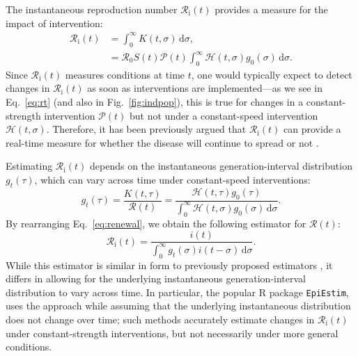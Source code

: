 \documentclass[12pt]{article}
\newcommand{\eref}[1]{Eq.~\ref{eq:#1}}
\newcommand{\fref}[1]{Fig.~\ref{fig:#1}}
\newcommand{\Rx}[1]{\ensuremath{{\mathcal R}_{#1}}\xspace}
\newcommand{\Ri}{\Rx{\mathrm{i}}}
\newcommand{\RR}{\ensuremath{{\mathcal R}}\xspace}
\newcommand{\dd}[1]{\ensuremath{\, \mathrm{d}#1}}
\newcommand{\dsigma}{\dd{\sigma}}
\newcommand{\PP}{\ensuremath{\mathcal P}}
\newcommand{\HH}{\ensuremath{\mathcal H}}
\begin{document}
The instantaneous reproduction number $\Ri(t)$ provides a measure for the impact of intervention:
\begin{align}
\Ri(t) &= \int_0^\infty K(t, \sigma) \dsigma, \\
&= \RR_0 S(t) \PP(t) \int_0^\infty \HH(t,\sigma) g_0(\sigma) \dsigma.
\label{eq:rt}
\end{align}
Since $\Ri(t)$ measures conditions at time $t$, one would typically expect to detect changes in $\Ri(t)$ as soon as interventions are implemented---as we see in \eref{rt} (and also in \fref{indpop}), this is true for changes in a constant-strength intervention $\PP(t)$ but not under a constant-speed intervention $\HH(t, \sigma)$.
Therefore, it has been previously argued that $\Ri(t)$ can provide a real-time measure for whether the disease will continue to spread or not \citep{gostic2020practical}.

Estimating $\Ri(t)$ depends on the instantaneous generation-interval distribution $g_t(\tau)$,
which can vary across time under constant-speed interventions:
\begin{equation}
g_t(\tau) = \frac{K(t, \tau)}{\RR(t)} = \frac{\HH(t,\tau) g_0(\tau)}{\int_0^\infty \HH(t,\sigma) g_0(\sigma) \dsigma}.
\end{equation}
By rearranging \eref{renewal}, we obtain the following estimator for $\RR(t)$:
\begin{equation}
\Ri(t) = \frac{i(t)}{\int_0^\infty g_t(\sigma) i(t-\sigma) \dsigma}.
\end{equation}
While this estimator is similar in form to previously proposed estimators \citep{fraser2007estimating}, it differs in allowing for the underlying instantaneous generation-interval distribution to vary across time.
In particular, the popular R package \texttt{EpiEstim}, \cite{cori2013new} uses the approach while assuming that the underlying instantaneous distribution does not change over time; 
such methods accurately estimate changes in $\Ri(t)$ under constant-strength interventions, but not necessarily under more general conditions.
\end{document}
